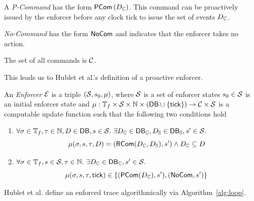 \begin{definition}
    \label{def:enf-p-cmd}
    A \emph{P-Command} has the form
    $\mathsf{PCom} \left( D_{\mathbb{C}} \right)$.
    This command can be proactively issued by the enforcer before any
    clock tick to issue the set of events $D_{\mathbb{C}}$.
\end{definition}

\begin{definition}
    \label{def:enf-no-cmd}
    \emph{No-Command} has the form $\mathsf{NoCom}$ and indicates that the enforcer takes
    no action.
\end{definition}

\begin{definition}
    The set of all commands is $\mathcal{C}$.
\end{definition}

This leads us to Hublet et al.'s \cite{whyenf, whyenf-2} definition of a proactive enforcer.
\begin{definition}
    \label{def:enforcer-triple}
    An \emph{Enforcer} $\mathcal{E}$ is a triple
    $\left(\mathcal{S}, s_0, \mu \right)$, where $\mathcal{S}$ is a set of 
    enforcer states
    $s_0 \in \mathcal{S}$ is an initial enforcer state and
    $\mu : \mathbb{T}_f \times \mathcal{S}
    \times \mathbb{N} \times \left( \mathsf{DB} \cup \left\{ \mathsf{tick} \right\} \right)
    \to \mathcal{C} \times \mathcal{S}$
    is a computable update function such that the following two
    conditions hold
    \begin{enumerate}
        \item 
            $ \forall \sigma \in \mathbb{T}_f, \tau \in \mathbb{N},
            D \in \mathsf{DB},
            s \in \mathcal{S}.~
            \exists D_{\mathbb{C}} \in \mathsf{DB}_{\mathbb{C}}, D_{\mathbb{S}} \in \mathsf{DB}_{\mathbb{S}},
            s' \in \mathcal{S}.$
        \begin{equation*}
            \mu(\sigma,s,\tau, D)
            = (\mathsf{RCom}(D_{\mathbb{C}},D_{\mathbb{S}}), s') \wedge D_{\mathbb{C}} \subseteq D
        \end{equation*}
        
        \item
            $\forall \sigma \in \mathbb{T}_f, s \in \mathcal{S}, \tau \in \mathbb{N}.~
            \exists D_{\mathbb{C}} \in \mathsf{DB}_{\mathbb{C}}, s' \in \mathcal{S}.$
            \begin{equation*}
                \mu(\sigma,s,\tau,\mathsf{tick})
                \in \{(\mathsf{PCom}(D_{\mathbb{C}}), s'), (\mathsf{NoCom},s')\}
            \end{equation*}
    \end{enumerate}
\end{definition}
Hublet et al. \cite{whyenf-2} define an enforced trace algorithmically via
Algorithm~\ref{alg:loop}.


